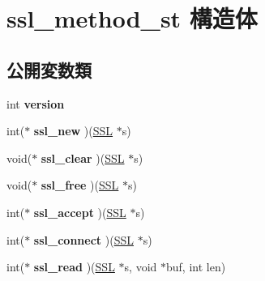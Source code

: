 \hypertarget{structssl__method__st}{}\section{ssl\+\_\+method\+\_\+st 構造体}
\label{structssl__method__st}
\subsection*{公開変数類}
\begin{DoxyCompactItemize}
\item 
\hypertarget{structssl__method__st_a1d231051899c943c03267d9ede6d2488}{}int {\bfseries version}\label{structssl__method__st_a1d231051899c943c03267d9ede6d2488}

\item 
\hypertarget{structssl__method__st_a7a5b5fc62a1f2d1e130bb67f5da66a81}{}int($\ast$ {\bfseries ssl\+\_\+new} )(\hyperlink{structssl__st}{S\+S\+L} $\ast$s)\label{structssl__method__st_a7a5b5fc62a1f2d1e130bb67f5da66a81}

\item 
\hypertarget{structssl__method__st_ae1a1f21bb25134669738357096bfd629}{}void($\ast$ {\bfseries ssl\+\_\+clear} )(\hyperlink{structssl__st}{S\+S\+L} $\ast$s)\label{structssl__method__st_ae1a1f21bb25134669738357096bfd629}

\item 
\hypertarget{structssl__method__st_a8df364610bd0f741b9fe078a69d88e28}{}void($\ast$ {\bfseries ssl\+\_\+free} )(\hyperlink{structssl__st}{S\+S\+L} $\ast$s)\label{structssl__method__st_a8df364610bd0f741b9fe078a69d88e28}

\item 
\hypertarget{structssl__method__st_a414ff7e2c280fb8e5cee22bff2df8717}{}int($\ast$ {\bfseries ssl\+\_\+accept} )(\hyperlink{structssl__st}{S\+S\+L} $\ast$s)\label{structssl__method__st_a414ff7e2c280fb8e5cee22bff2df8717}

\item 
\hypertarget{structssl__method__st_acfec7986091a9749de81345a3833b595}{}int($\ast$ {\bfseries ssl\+\_\+connect} )(\hyperlink{structssl__st}{S\+S\+L} $\ast$s)\label{structssl__method__st_acfec7986091a9749de81345a3833b595}

\item 
\hypertarget{structssl__method__st_a113246b4c830059207f54935b8874289}{}int($\ast$ {\bfseries ssl\+\_\+read} )(\hyperlink{structssl__st}{S\+S\+L} $\ast$s, void $\ast$buf, int len)\label{structssl__method__st_a113246b4c830059207f54935b8874289}


\end{DoxyCompactItemize}
